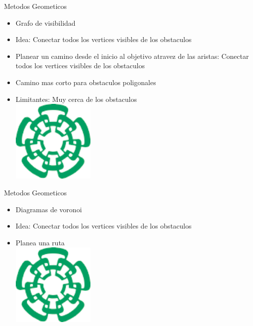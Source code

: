 \documentclass[
	11pt, %
]{beamer}
\begin{document}
\begin{frame}{Metodos Geometicos}
  \begin{itemize}
  \item Grafo de visibilidad\\
  \item Idea: Conectar todos los vertices visibles  de los obstaculos\\
  \item Planear un camino desde el inicio al objetivo atravez de las aristas: Conectar todos los vertices visibles  de los obstaculos\\
  \item Camino mas corto para obstaculos poligonales\\
  \item Limitantes: Muy cerca de los obstaculos\\
    \centering
    \includegraphics[angle=45,width=4cm]{cinvestavlogo}
  \end{itemize}
\end{frame}

\begin{frame}{Metodos Geometicos}
  \begin{itemize}
  \item Diagramas de voronoi\\
  \item Idea: Conectar todos los vertices visibles  de los obstaculos\\
  \item Planea una ruta\\
    \centering
    \includegraphics[angle=45,width=4cm]{cinvestavlogo}
  \end{itemize}
\end{frame}
\end{document}
